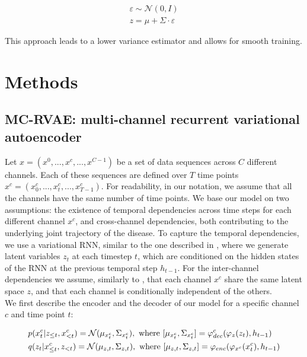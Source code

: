 \begin{equation}
\begin{split}
    \varepsilon \sim \mathcal{N}(0,I) \\
    z = \mu + \Sigma \cdot \varepsilon
\end{split}
\end{equation}

This approach leads to a lower variance estimator and allows for smooth training.

\section{Methods}
\label{rnn:methods}

\subsection{MC-RVAE: multi-channel recurrent variational autoencoder}

Let $x = (x^0,...,x^c,...,x^{C-1})$ be a set of data sequences across $C$ different channels. Each of these sequences are defined over $T$ time points  $x^c = (x^c_{0},...,x^c_{t},...,x^c_{T-1})$. For readability, in our notation, we assume that all the channels have the same number of time points. We base our model on two assumptions: the existence of temporal dependencies across time steps for each different channel $x^c$, and cross-channel dependencies, both contributing to the underlying joint trajectory of the disease. To capture the temporal dependencies, we use a variational RNN, similar to the one described in \cite{Chung2015}, where we generate latent variables $z_t$ at each timestep $t$, which are conditioned on the hidden states of the RNN at the previous temporal step $h_{t-1}$. For the inter-channel dependencies we assume, similarly to \cite{Antelmi2019}, that each channel $x^c$ share the same latent space $z$, and that each channel is conditionally independent of the others. \\

We first describe the encoder and the decoder of our model for a specific channel $c$ and time point $t$:

\begin{equation} 
\begin{aligned} \label{rnn:eq:generative}
\displaystyle
& \mathit{p}(x^c_t | z_{\leq t}, x^c_{< t}) = \mathcal{N}(\mu_{x^c_t},\Sigma_{x^c_t}), \text{ where } [\mu_{x^c_t},\Sigma_{x^c_t}] = \varphi_{dec}^c(\varphi_{z}(z_t), h_{t-1}) \\
& \mathit{q}(z_t | x^c_{\leq t}, z_{< t}) = \mathcal{N}(\mu_{z,t},\Sigma_{z,t}), \text{ where } [ \mu_{z,t},\Sigma_{z,t}] = \varphi_{enc}(\varphi_{x^c}(x^c_{t}), h_{t-1}) \\
\end{aligned}
\end{equation}

